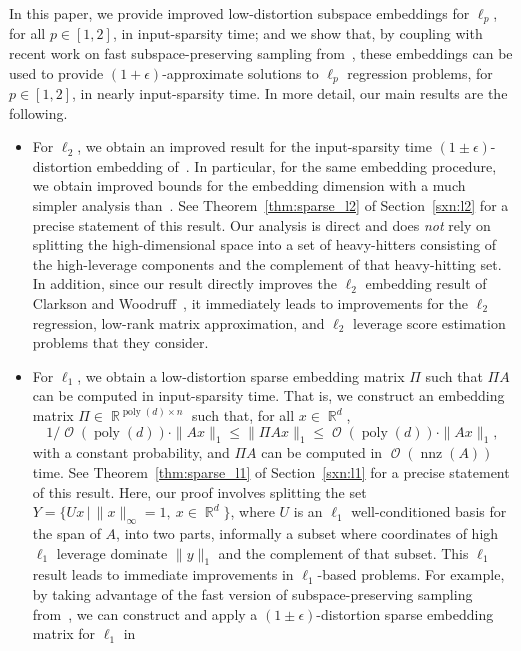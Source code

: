 \documentclass[11pt]{article}
\DeclareMathOperator{\poly}{poly}
\DeclareMathOperator{\bigO}{\mathcal{O}}
\DeclareMathOperator{\nnz}{nnz}
\DeclareMathOperator{\R}{\mathbb{R}}
\begin{document}
In this paper, we provide improved low-distortion subspace embeddings for
$\ell_p$, for all $p\in[1,2]$, in input-sparsity time; and we show that, by
coupling with recent work on fast subspace-preserving sampling
from~\cite{CDMMMW13_SODA}, these embeddings can be used to provide
$(1+\epsilon)$-approximate solutions to $\ell_p$ regression problems, for
$p\in[1,2]$, in nearly input-sparsity time.
In more detail, our main results are the following.
\begin{itemize}
\item For $\ell_2$, we obtain an improved result for the input-sparsity time
  $(1\pm\epsilon)$-distortion embedding of~\cite{CW12sparse_TR}.
In particular, for the same embedding procedure, we obtain improved bounds 
  for the embedding dimension with a much simpler analysis 
  than~\cite{CW12sparse_TR}.
  See Theorem~\ref{thm:sparse_l2} of Section~\ref{sxn:l2} for a precise 
  statement of this result.
  Our analysis is direct and does \emph{not} rely on splitting the 
  high-dimensional space into a set of heavy-hitters consisting of the 
  high-leverage components and the complement of that heavy-hitting set.  
  In addition, since our result directly improves the $\ell_2$ embedding 
  result of Clarkson and Woodruff~\cite{CW12sparse_TR}, it immediately leads 
  to improvements for the $\ell_2$ regression, low-rank matrix approximation, 
  and $\ell_2$ leverage score estimation problems that they consider.
\item For $\ell_1$, we obtain a low-distortion sparse embedding matrix $\Pi$
  such that $\Pi A$ can be computed in input-sparsity time.
That is, we construct an embedding matrix $\Pi \in
  \R^{\poly(d) \times n}$ such that, for all $x\in\R^{d}$,
  $$
  1/\bigO(\poly(d)) \cdot \|Ax\|_1 \le \|\Pi A x\|_1 \le \bigO(\poly(d)) \cdot
  \|Ax\|_1,
  $$
  with a constant probability, and $\Pi A$ can be computed in $\bigO(\nnz(A))$
  time.  
  See Theorem~\ref{thm:sparse_l1} of Section~\ref{sxn:l1} for a precise
  statement of this result.  
  Here, our proof involves splitting the set $Y = \{ U x \,|\,
  \|x\|_{\infty}=1,\ x\in\R^{d} \}$, where $U$ is an $\ell_1$ well-conditioned
  basis for the span of $A$, into two parts, informally a subset where
  coordinates of high $\ell_1$ leverage dominate $\|y\|_1$ and the complement of
  that subset. 
  This $\ell_1$ result leads to immediate improvements in $\ell_1$-based
  problems.
  For example, by taking advantage of the fast version of subspace-preserving
  sampling from~\cite{CDMMMW13_SODA}, we can construct and apply a
  $(1\pm\epsilon)$-distortion sparse embedding matrix for $\ell_1$ in

\end{itemize}
\end{document}
